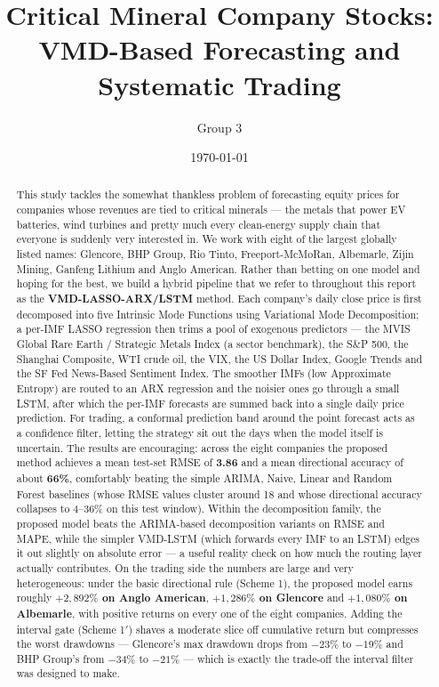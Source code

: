 \documentclass[11pt,a4paper]{article}
\title{\textbf{Critical Mineral Company Stocks:\\ VMD-Based Forecasting and Systematic Trading}}
\author{Group 3}
\date{\today}
\begin{document}
\maketitle

\begin{abstract}
This study tackles the somewhat thankless problem of forecasting equity prices for companies whose revenues are tied to critical minerals --- the metals that power EV batteries, wind turbines and pretty much every clean-energy supply chain that everyone is suddenly very interested in. We work with eight of the largest globally listed names: Glencore, BHP Group, Rio Tinto, Freeport-McMoRan, Albemarle, Zijin Mining, Ganfeng Lithium and Anglo American. Rather than betting on one model and hoping for the best, we build a hybrid pipeline that we refer to throughout this report as the \textbf{VMD-LASSO-ARX/LSTM} method. Each company's daily close price is first decomposed into five Intrinsic Mode Functions using Variational Mode Decomposition; a per-IMF LASSO regression then trims a pool of exogenous predictors --- the MVIS Global Rare Earth / Strategic Metals Index (a sector benchmark), the S\&P 500, the Shanghai Composite, WTI crude oil, the VIX, the US Dollar Index, Google Trends and the SF Fed News-Based Sentiment Index. The smoother IMFs (low Approximate Entropy) are routed to an ARX regression and the noisier ones go through a small LSTM, after which the per-IMF forecasts are summed back into a single daily price prediction. For trading, a conformal prediction band around the point forecast acts as a confidence filter, letting the strategy sit out the days when the model itself is uncertain. The results are encouraging: across the eight companies the proposed method achieves a mean test-set RMSE of \textbf{3.86} and a mean directional accuracy of about \textbf{66\%}, comfortably beating the simple ARIMA, Naive, Linear and Random Forest baselines (whose RMSE values cluster around 18 and whose directional accuracy collapses to 4--36\% on this test window). Within the decomposition family, the proposed model beats the ARIMA-based decomposition variants on RMSE and MAPE, while the simpler VMD-LSTM (which forwards every IMF to an LSTM) edges it out slightly on absolute error --- a useful reality check on how much the routing layer actually contributes. On the trading side the numbers are large and very heterogeneous: under the basic directional rule (Scheme 1), the proposed model earns roughly \textbf{$+2{,}892\%$ on Anglo American}, \textbf{$+1{,}286\%$ on Glencore} and \textbf{$+1{,}080\%$ on Albemarle}, with positive returns on every one of the eight companies. Adding the interval gate (Scheme 1$'$) shaves a moderate slice off cumulative return but compresses the worst drawdowns --- Glencore's max drawdown drops from $-23\%$ to $-19\%$ and BHP Group's from $-34\%$ to $-21\%$ --- which is exactly the trade-off the interval filter was designed to make.
\end{abstract}
\end{document}
